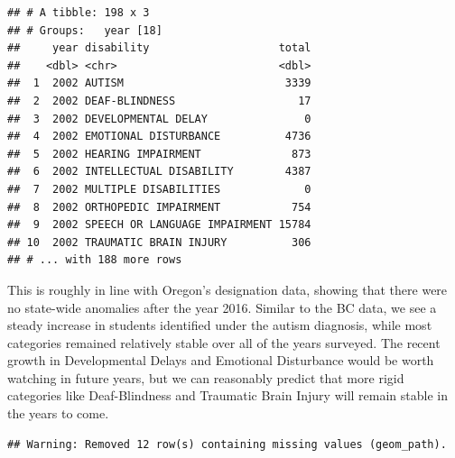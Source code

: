 \documentclass[
  english,
  man]{apa6}
\begin{document}
\begin{verbatim}
## # A tibble: 198 x 3
## # Groups:   year [18]
##     year disability                    total
##    <dbl> <chr>                         <dbl>
##  1  2002 AUTISM                         3339
##  2  2002 DEAF-BLINDNESS                   17
##  3  2002 DEVELOPMENTAL DELAY               0
##  4  2002 EMOTIONAL DISTURBANCE          4736
##  5  2002 HEARING IMPAIRMENT              873
##  6  2002 INTELLECTUAL DISABILITY        4387
##  7  2002 MULTIPLE DISABILITIES             0
##  8  2002 ORTHOPEDIC IMPAIRMENT           754
##  9  2002 SPEECH OR LANGUAGE IMPAIRMENT 15784
## 10  2002 TRAUMATIC BRAIN INJURY          306
## # ... with 188 more rows
\end{verbatim}

This is roughly in line with Oregon's designation data, showing that there were no state-wide anomalies after the year 2016. Similar to the BC data, we see a steady increase in students identified under the autism diagnosis, while most categories remained relatively stable over all of the years surveyed. The recent growth in Developmental Delays and Emotional Disturbance would be worth watching in future years, but we can reasonably predict that more rigid categories like Deaf-Blindness and Traumatic Brain Injury will remain stable in the years to come.

\begin{verbatim}
## Warning: Removed 12 row(s) containing missing values (geom_path).
\end{verbatim}
\end{document}
